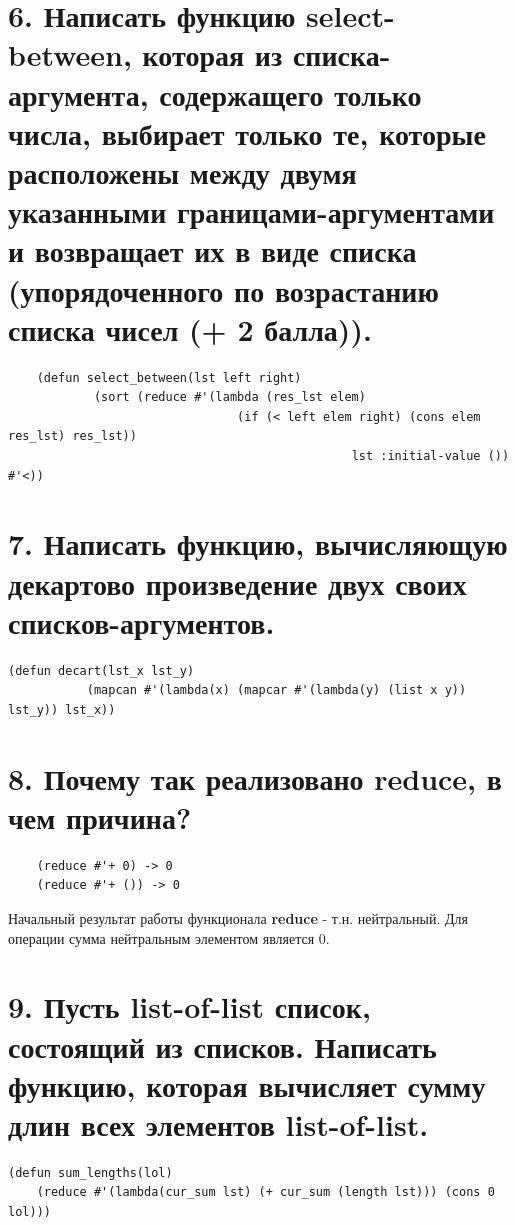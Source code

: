 \documentclass[12pt]{report}
\begin{document}
\section*{6. Написать функцию select-between, которая из списка-аргумента, содержащего только числа, выбирает только те, которые расположены между двумя указанными границами-аргументами и возвращает их в виде списка (упорядоченного по возрастанию списка чисел (+ 2 балла)).}

\begin{lstlisting}
	(defun select_between(lst left right)
			(sort (reduce #'(lambda (res_lst elem) 
								(if (< left elem right) (cons elem res_lst) res_lst)) 
												lst :initial-value ()) #'<))
\end{lstlisting}

\section*{7. Написать функцию, вычисляющую декартово произведение двух своих списков-аргументов.}

\begin{lstlisting}
(defun decart(lst_x lst_y)
		   (mapcan #'(lambda(x) (mapcar #'(lambda(y) (list x y)) lst_y)) lst_x))
\end{lstlisting}

\section*{8. Почему так реализовано reduce, в чем причина?}

\begin{lstlisting}
	(reduce #'+ 0) -> 0
	(reduce #'+ ()) -> 0
\end{lstlisting}

Начальный результат работы функционала \textbf{reduce} - т.н. нейтральный. Для операции сумма нейтральным элементом является 0. 

\section*{9. Пусть list-of-list список, состоящий из списков. Написать функцию, которая вычисляет сумму длин всех элементов list-of-list.}

\begin{lstlisting}
(defun sum_lengths(lol) 
    (reduce #'(lambda(cur_sum lst) (+ cur_sum (length lst))) (cons 0 lol)))
\end{lstlisting}
\end{document}
